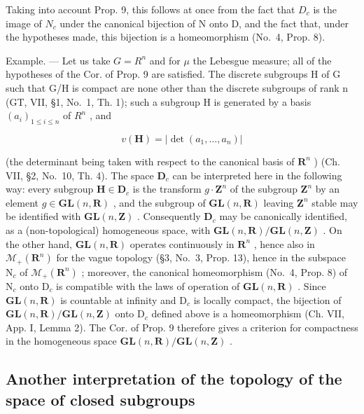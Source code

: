 Taking into account Prop. 9, this follows at once from the fact that \(D_{c}\) is the image of \(N_{c}\) under the canonical bijection of N onto D, and the fact that, under the hypotheses made, this bijection is a homeomorphism (No.~4, Prop. 8).

Example. --- Let us take \(G = R^{n}\) and for \(\mu\) the Lebesgue measure; all of the hypotheses of the Cor. of Prop. 9 are satisfied. The discrete subgroups H of G such that G/H is compact are none other than the discrete subgroups of rank n (GT, VII, §1, No.~1, Th. 1); such a subgroup H is generated by a basis \((a_{i})_{1 \leqslant i \leqslant n}\) of \(R^{n}\) , and

\[
v (\mathbf {H}) = | \det (a _ {1}, \dots , a _ {n}) |
\]

(the determinant being taken with respect to the canonical basis of \(\mathbf{R}^n\) ) (Ch. VII, §2, No.~10, Th. 4). The space \(\mathbf{D}_c\) can be interpreted here in the following way: every subgroup \(\mathbf{H} \in \mathbf{D}_c\) is the transform \(g \cdot \mathbf{Z}^n\) of the subgroup \(\mathbf{Z}^n\) by an element \(g \in \mathbf{GL}(n, \mathbf{R})\) , and the subgroup of \(\mathbf{GL}(n, \mathbf{R})\) leaving \(\mathbf{Z}^n\) stable may be identified with \(\mathbf{GL}(n, \mathbf{Z})\) . Consequently \(\mathbf{D}_c\) may be canonically identified, as a (non-topological) homogeneous space, with \(\mathbf{GL}(n, \mathbf{R}) / \mathbf{GL}(n, \mathbf{Z})\) . On the other hand, \(\mathbf{GL}(n, \mathbf{R})\) operates continuously in \(\mathbf{R}^n\) , hence also in \(\mathcal{M}_{+}(\mathbf{R}^{n})\) for the vague topology (§3, No.~3, Prop. 13), hence in the subspace \(\mathrm{N}_c\) of \(\mathcal{M}_{+}(\mathbf{R}^{n})\) ; moreover, the canonical homeomorphism (No.~4, Prop. 8) of \(\mathrm{N}_c\) onto \(\mathrm{D}_c\) is compatible with the laws of operation of \(\mathbf{GL}(n, \mathbf{R})\) . Since \(\mathbf{GL}(n, \mathbf{R})\) is countable at infinity and \(\mathrm{D}_c\) is locally compact, the bijection of \(\mathbf{GL}(n, \mathbf{R}) / \mathbf{GL}(n, \mathbf{Z})\) onto \(\mathrm{D}_c\) defined above is a homeomorphism (Ch. VII, App. I, Lemma 2). The Cor. of Prop. 9 therefore gives a criterion for compactness in the homogeneous space \(\mathbf{GL}(n, \mathbf{R}) / \mathbf{GL}(n, \mathbf{Z})\) .

\subsection{Another interpretation of the topology of the space of closed subgroups}

